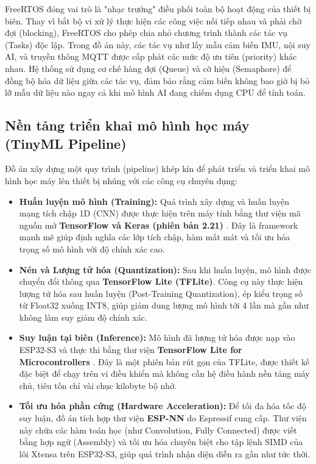 \documentclass[../DoAn.tex]{subfiles}
\begin{document}
FreeRTOS đóng vai trò là "nhạc trưởng" điều phối toàn bộ hoạt động của thiết bị biên. Thay vì bắt bộ vi xử lý thực hiện các công việc nối tiếp nhau và phải chờ đợi (blocking), FreeRTOS cho phép chia nhỏ chương trình thành các tác vụ (Tasks) độc lập. Trong đồ án này, các tác vụ như lấy mẫu cảm biến IMU, nội suy AI, và truyền thông MQTT được cấp phát các mức độ ưu tiên (priority) khác nhau. Hệ thống sử dụng cơ chế hàng đợi (Queue) và cờ hiệu (Semaphore) để đồng bộ hóa dữ liệu giữa các tác vụ, đảm bảo rằng cảm biến không bao giờ bị bỏ lỡ mẫu dữ liệu nào ngay cả khi mô hình AI đang chiếm dụng CPU để tính toán.

\subsection{Nền tảng triển khai mô hình học máy (TinyML Pipeline)}
Đồ án xây dựng một quy trình (pipeline) khép kín để phát triển và triển khai mô hình học máy lên thiết bị nhúng với các công cụ chuyên dụng:
\begin{itemize}
    \item \textbf{Huấn luyện mô hình (Training):} Quá trình xây dựng và huấn luyện mạng tích chập 1D (CNN) được thực hiện trên máy tính bằng thư viện mã nguồn mở \textbf{TensorFlow và Keras (phiên bản 2.21)} \cite{abadi2016tensorflow}. Đây là framework mạnh mẽ giúp định nghĩa các lớp tích chập, hàm mất mát và tối ưu hóa trọng số mô hình với độ chính xác cao.
    \item \textbf{Nén và Lượng tử hóa (Quantization):} Sau khi huấn luyện, mô hình được chuyển đổi thông qua \textbf{TensorFlow Lite (TFLite)}. Công cụ này thực hiện lượng tử hóa sau huấn luyện (Post-Training Quantization), ép kiểu trọng số từ Float32 xuống INT8, giúp giảm dung lượng mô hình tới 4 lần mà gần như không làm suy giảm độ chính xác.
    \item \textbf{Suy luận tại biên (Inference):} Mô hình đã lượng tử hóa được nạp vào ESP32-S3 và thực thi bằng thư viện \textbf{TensorFlow Lite for Microcontrollers} \cite{david2021tensorflowlite}. Đây là một phiên bản rút gọn của TFLite, được thiết kế đặc biệt để chạy trên vi điều khiển mà không cần hệ điều hành nền tảng máy chủ, tiêu tốn chỉ vài chục kilobyte bộ nhớ.
    \item \textbf{Tối ưu hóa phần cứng (Hardware Acceleration):} Để tối đa hóa tốc độ suy luận, đồ án tích hợp thư viện \textbf{ESP-NN} \cite{espressif2023espnn} do Espressif cung cấp. Thư viện này chứa các hàm toán học (như Convolution, Fully Connected) được viết bằng hợp ngữ (Assembly) và tối ưu hóa chuyên biệt cho tập lệnh SIMD của lõi Xtensa trên ESP32-S3, giúp quá trình nhận diện diễn ra gần như tức thời.
\end{itemize}
\end{document}

